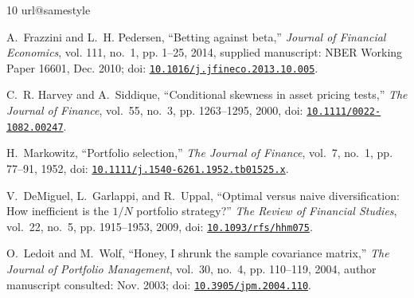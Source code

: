 \documentclass[letterpaper,journal]{IEEEtran}
\begin{document}
\begin{thebibliography}{10}
\providecommand{\url}[1]{#1}
\csname url@samestyle\endcsname
\providecommand{\newblock}{\relax}
\providecommand{\bibinfo}[2]{#2}
\providecommand{\BIBentrySTDinterwordspacing}{\spaceskip=0pt\relax}
\providecommand{\BIBentryALTinterwordstretchfactor}{4}
\providecommand{\BIBentryALTinterwordspacing}{\spaceskip=\fontdimen2\font plus
\BIBentryALTinterwordstretchfactor\fontdimen3\font minus
  \fontdimen4\font\relax}
\providecommand{\BIBforeignlanguage}[2]{{%
\expandafter\ifx\csname l@#1\endcsname\relax
\typeout{** WARNING: IEEEtran.bst: No hyphenation pattern has been}%
\typeout{** loaded for the language `#1'. Using the pattern for}%
\typeout{** the default language instead.}%
\else
\language=\csname l@#1\endcsname
\fi
#2}}
\providecommand{\BIBdecl}{\relax}
\BIBdecl

A.~Frazzini and L.~H. Pedersen, ``Betting against beta,'' \emph{Journal of
  Financial Economics}, vol. 111, no.~1, pp. 1--25, 2014, supplied manuscript:
  NBER Working Paper 16601, Dec. 2010; doi:
  \href{https://doi.org/10.1016/j.jfineco.2013.10.005}{\nolinkurl{10.1016/j.jfineco.2013.10.005}}.

C.~R. Harvey and A.~Siddique, ``Conditional skewness in asset pricing tests,''
  \emph{The Journal of Finance}, vol.~55, no.~3, pp. 1263--1295, 2000, doi:
  \href{https://doi.org/10.1111/0022-1082.00247}{\nolinkurl{10.1111/0022-1082.00247}}.

H.~Markowitz, ``Portfolio selection,'' \emph{The Journal of Finance}, vol.~7,
  no.~1, pp. 77--91, 1952, doi:
  \href{https://doi.org/10.1111/j.1540-6261.1952.tb01525.x}{\nolinkurl{10.1111/j.1540-6261.1952.tb01525.x}}.

V.~DeMiguel, L.~Garlappi, and R.~Uppal, ``Optimal versus naive diversification:
  How inefficient is the {$1/N$} portfolio strategy?'' \emph{The Review of
  Financial Studies}, vol.~22, no.~5, pp. 1915--1953, 2009, doi:
  \href{https://doi.org/10.1093/rfs/hhm075}{\nolinkurl{10.1093/rfs/hhm075}}.

O.~Ledoit and M.~Wolf, ``Honey, {I} shrunk the sample covariance matrix,''
  \emph{The Journal of Portfolio Management}, vol.~30, no.~4, pp. 110--119,
  2004, author manuscript consulted: Nov. 2003; doi:
  \href{https://doi.org/10.3905/jpm.2004.110}{\nolinkurl{10.3905/jpm.2004.110}}.


\end{thebibliography}
\end{document}
